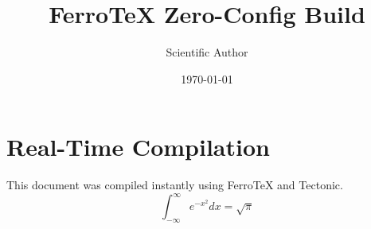 \documentclass{article}
\title{FerroTeX Zero-Config Build}
\author{Scientific Author}
\date{\today}
\begin{document}
\maketitle

\section{Real-Time Compilation}
This document was compiled instantly using FerroTeX and Tectonic.
\begin{equation}
  \int_{-\infty}^{\infty} e^{-x^2} dx = \sqrt{\pi}
\end{equation}
\end{document}
